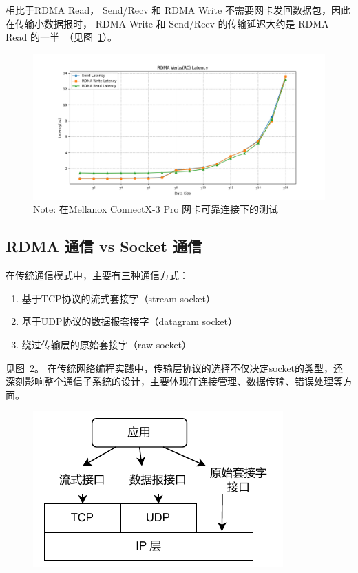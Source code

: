 {    相比于RDMA Read， Send/Recv 和 RDMA Write 不需要网卡发回数据包，因此在传输小数据报时，
    RDMA Write 和 Send/Recv 的传输延迟大约是 RDMA Read 的一半~\citep{kalia2014herd}（见图~\ref{fig:RDMA-Verbs-Latency}）。
    \begin{figure}[!htbp]
        \centering
        \includegraphics[width=\linewidth]{Img/verbs-latency.png}
        {\small Note: 在Mellanox ConnectX-3 Pro 网卡可靠连接下的测试}
        \label{fig:RDMA-Verbs-Latency}
    \end{figure}

    \subsection{RDMA 通信 vs Socket 通信}

    在传统通信模式中，主要有三种通信方式：
    \begin{enumerate}
        \item 基于TCP协议的流式套接字（stream socket）
        \item 基于UDP协议的数据报套接字（datagram socket）
        \item 绕过传输层的原始套接字（raw socket）
    \end{enumerate}

    见图~\ref{fig:Socket-Type}。
    在传统网络编程实践中，传输层协议的选择不仅决定socket的类型，还深刻影响整个通信子系统的设计，主要体现在连接管理、数据传输、错误处理等方面。
    \begin{figure}[!htbp]
        \centering
        \includegraphics[width=0.35\linewidth]{Img/三种socket类型.drawio.pdf}
        \label{fig:Socket-Type}
    \end{figure}

}

